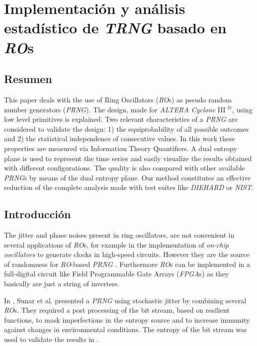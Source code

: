 \section{Implementación y análisis estadístico de \emph{TRNG} basado en \emph{RO}s}

\subsection{Resumen}

This paper deals with the use of Ring Oscillators (\emph{RO}s) as
pseudo random number generators (\emph{PRNG}).
The design, made for \emph{ALTERA Cyclone} III $^{\copyright} $, using low level primitives is explained.
Two relevant characteristics of a \emph{PRNG} are considered to validate the design: 1) the
equiprobability of all possible outcomes and 2) the statistical
independence of consecutive values. In this work these properties are measured via Information Theory Quantifiers.
A dual entropy plane is used to represent the time series and easily visualize the results obtained with different configurations.
The quality is also compared with other available  \emph{PRNG}s by means of the dual entropy plane.
 Our method constitutes an effective reduction of the complete analysis made with test
suites like \emph{DIEHARD} or \emph{NIST}.

\subsection{Introducción}
\label{sec:Intro}

The jitter and phase noises present in ring oscillators, are not
convenient in several applications of \emph{RO}s, for example in the implementation of \emph{on-chip oscillators} to generate clocks in high-speed circuits\cite{Hajimiri1999,Mandal2010,Gupta2011}. However they are the source of randomness for \emph{RO}-based \emph{PRNG} \cite{Sunar2007,Wold2009}. Furthermore \emph{RO}s can be implemented in a full-digital circuit like Field Programmable Gate Arrays (\emph{FPGA}s) as they  basically are just a string of inverters.


In \cite{Sunar2007}, Sunar et al. presented a \emph{PRNG} using
stochastic jitter by combining several \emph{RO}s. They required a
post processing of the bit stream, based on resilient functions,
to mask imperfections in the entropy source and to increase
immunity against changes in environmental conditions. The entropy of the bit stream was used to
validate the results in \cite{Sunar2007}.


